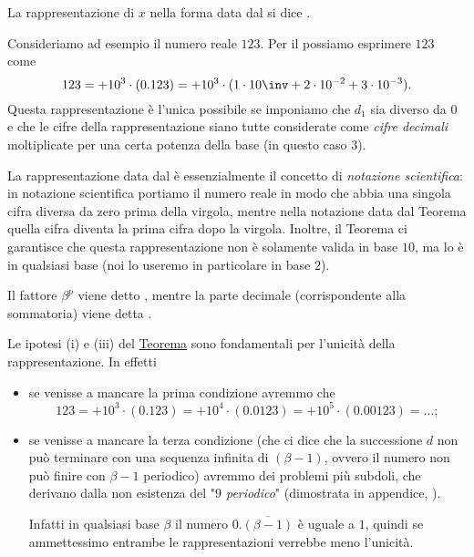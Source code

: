 La rappresentazione di $x$ nella forma data dal  si dice .

\begin{example}
    Consideriamo ad esempio il numero reale $123$. Per il  possiamo esprimere $123$ come \[
        123 = +10^3 \cdot (0.123) = + 10^3 \cdot (1 \cdot 10\inv + 2 \cdot 10^{-2} + 3 \cdot 10^{-3}).
    \] Questa rappresentazione è l'unica possibile se imponiamo che $d_1$ sia diverso da $0$ e che le cifre della rappresentazione siano tutte considerate come \emph{cifre decimali} moltiplicate per una certa potenza della base (in questo caso $3$).
\end{example}

La rappresentazione data dal  è essenzialmente il concetto di \emph{notazione scientifica}: in notazione scientifica portiamo il numero reale in modo che abbia una singola cifra diversa da zero prima della virgola, mentre nella notazione data dal Teorema quella cifra diventa la prima cifra dopo la virgola. 
Inoltre, il Teorema ci garantisce che questa rappresentazione non è solamente valida in base $10$, ma lo è in qualsiasi base (noi lo useremo in particolare in base $2$).

Il fattore $\beta^p$ viene detto , mentre la parte decimale (corrispondente alla sommatoria) viene detta . 

\begin{remark} 
    Le ipotesi (i) e (iii) del \hyperref[th:rapp_base]{Teorema} sono fondamentali per l'unicità della rappresentazione. In effetti
    \begin{itemize}
        \item se venisse a mancare la prima condizione avremmo che \[
            123 = +10^3 \cdot (0.123) = +10^4 \cdot (0.0123) = +10^5 \cdot (0.00123) = \dots;
        \]
        \item se venisse a mancare la terza condizione 
        (che ci dice che la successione $d$ non può terminare con una sequenza infinita di $(\beta - 1)$, ovvero il numero non può finire con $\beta-1$ periodico) 
        avremmo dei problemi più subdoli, che derivano dalla non esistenza del "\emph{$9$ periodico}" (dimostrata in appendice, ). 
        
        Infatti in qualsiasi base $\beta$ il numero $0.\overline{(\beta-1)}$ è uguale a $1$, quindi se ammettessimo entrambe le rappresentazioni verrebbe meno l'unicità.
    \end{itemize}
\end{remark}

